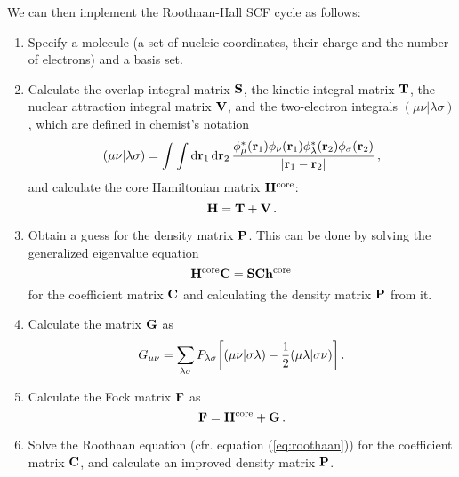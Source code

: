 \documentclass[12pt]{article}
\begin{document}
    We can then implement the Roothaan-Hall SCF cycle as follows:
    \begin{enumerate}
        \item Specify a molecule (a set of nucleic coordinates, their charge and the number of electrons) and a basis set.

        \item Calculate the overlap integral matrix $\vb{S}$, the kinetic integral matrix $\vb{T}$, the nuclear attraction integral matrix $\vb{V}$, and the two-electron integrals $(\mu \nu|\lambda \sigma)$, which are defined in chemist's notation
        \begin{equation}
            (\mu \nu|\lambda \sigma) = \int \int \dd{\vb{r}_1} \dd{\vb{r}_2} \frac{\phi_\mu^*(\vb{r}_1) \phi_\nu(\vb{r}_1) \phi_\lambda^*(\vb{r}_2) \phi_\sigma(\vb{r}_2)}{|\vb{r}_1 - \vb{r}_2|} \thinspace ,
        \end{equation}
        and calculate the core Hamiltonian matrix $\vb{H}^\text{core}$:
        \begin{equation}
            \vb{H} = \vb{T} + \vb{V} \thinspace .
        \end{equation}

        \item Obtain a guess for the density matrix $\vb{P}$. This can be done by solving the generalized eigenvalue equation
        \begin{equation}
            \vb{H}^\text{core} \vb{C} = \vb{S} \vb{C} \vb{h}^\text{core}
        \end{equation}
        for the coefficient matrix $\vb{C}$ and calculating the density matrix $\vb{P}$ from it.

        \item \label{item:scf:g_matrix}  Calculate the matrix $\vb{G}$ as
        \begin{equation}
            G_{\mu \nu} = \sum_{\lambda \sigma} P_{\lambda \sigma} \qty[ (\mu \nu|\sigma \lambda) - \frac{1}{2} (\mu \lambda|\sigma \nu)] \thinspace .
        \end{equation}

        \item Calculate the Fock matrix $\vb{F}$ as
        \begin{equation} \label{eq:fock_matrix}
            \vb{F} = \vb{H}^\text{core} + \vb{G} \thinspace .
        \end{equation}

        \item Solve the Roothaan equation (cfr. equation (\ref{eq:roothaan})) for the coefficient matrix $\vb{C}$, and calculate an improved density matrix $\vb{P}$.


\end{enumerate}
\end{document}
